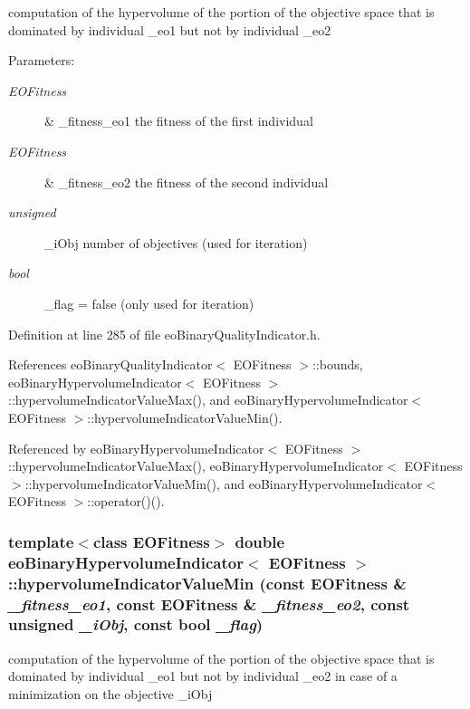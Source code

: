 computation of the hypervolume of the portion of the objective space that is dominated by individual \_\-eo1 but not by individual \_\-eo2 

\begin{Desc}
\item[Parameters:]
\begin{description}
\item[{\em EOFitness}]\& \_\-fitness\_\-eo1 the fitness of the first individual \item[{\em EOFitness}]\& \_\-fitness\_\-eo2 the fitness of the second individual \item[{\em unsigned}]\_\-i\-Obj number of objectives (used for iteration) \item[{\em bool}]\_\-flag = false (only used for iteration) \end{description}
\end{Desc}


Definition at line 285 of file eo\-Binary\-Quality\-Indicator.h.

References eo\-Binary\-Quality\-Indicator$<$ EOFitness $>$::bounds, eo\-Binary\-Hypervolume\-Indicator$<$ EOFitness $>$::hypervolume\-Indicator\-Value\-Max(), and eo\-Binary\-Hypervolume\-Indicator$<$ EOFitness $>$::hypervolume\-Indicator\-Value\-Min().

Referenced by eo\-Binary\-Hypervolume\-Indicator$<$ EOFitness $>$::hypervolume\-Indicator\-Value\-Max(), eo\-Binary\-Hypervolume\-Indicator$<$ EOFitness $>$::hypervolume\-Indicator\-Value\-Min(), and eo\-Binary\-Hypervolume\-Indicator$<$ EOFitness $>$::operator()().
\subsubsection{\setlength{\rightskip}{0pt plus 5cm}template$<$class EOFitness$>$ double {\bf eo\-Binary\-Hypervolume\-Indicator}$<$ EOFitness $>$::hypervolume\-Indicator\-Value\-Min (const EOFitness \& {\em \_\-fitness\_\-eo1}, const EOFitness \& {\em \_\-fitness\_\-eo2}, const unsigned {\em \_\-i\-Obj}, const bool {\em \_\-flag})\hspace{0.3cm}{\tt  [inline, private]}}\label{classeoBinaryHypervolumeIndicator_6c9b9a5279ad7894b4563e205f13e98b}


computation of the hypervolume of the portion of the objective space that is dominated by individual \_\-eo1 but not by individual \_\-eo2 in case of a minimization on the objective \_\-i\-Obj 

